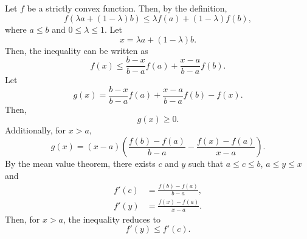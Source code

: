 \subsection{}
Let $f$ be a strictly convex function.
Then, by the definition,
%
\begin{equation}
f \left( \lambda a + (1 - \lambda) b \right) \leq \lambda f(a) + (1 - \lambda) f(b),
\end{equation}
%
where $a \leq b$ and $0 \leq \lambda \leq 1$.
Let
%
\begin{equation}
x = \lambda a + (1 - \lambda) b.
\end{equation}
%
Then, the inequality can be written as
%
\begin{equation}
f(x) \leq \frac{b - x}{b - a} f(a) + \frac{x - a}{b - a} f(b).
\end{equation}
%
Let 
%
\begin{equation}
g(x) = \frac{b - x}{b - a} f(a) + \frac{x - a}{b - a} f(b) - f(x).
\end{equation}
%
Then,
%
\begin{equation}
g(x) \geq 0.
\end{equation}
%
Additionally, for $x > a$,
%
\begin{equation}
g(x) = (x - a) \left( \frac{f(b) - f(a)}{b - a} - \frac{f(x) - f(a)}{x - a} \right).
\end{equation}
%
By the mean value theorem, there exists $c$ and $y$ such that $a \leq c \leq b$, $a \leq y \leq x$ and
%
\begin{equation}
\begin{aligned}
f'(c) &= \frac{f(b) - f(a)}{b - a}, \\
f'(y) &= \frac{f(x) - f(a)}{x - a}.
\end{aligned}
\end{equation}
%
Then, for $x > a$, the inequality reduces to
%
\begin{equation}
f'(y) \leq f'(c). 
\end{equation}
%



